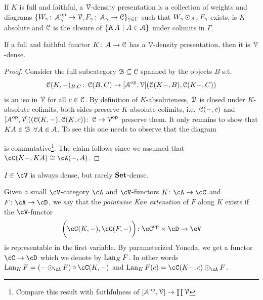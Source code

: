 \documentclass[a4paper,11pt,oneside,openany]{scrbook}
\begin{document}
\begin{defn}
	If $K$ is full and faithful, a $\operatorname{\mathcal{V}}$-density presentation is a collection of
    weights and diagrams $\{W_\gamma\colon\operatorname{\mathcal{A}}^{\operatorname{\text{op}}}_\gamma\to\operatorname{\mathcal{V}},
    F_\gamma\colon\operatorname{\mathcal{A}}_\gamma\to\operatorname{\mathcal{C}}\}_{\gamma\in\Gamma}$ such that
    $W_\gamma\operatorname{\odot}_{\operatorname{\mathcal{A}}_\gamma}F_\gamma$ exists, is $K$-absolute and $\operatorname{\mathcal{C}}$ is the
    closure of $\{KA\ |\ A\in\operatorname{\mathcal{A}}\}$ under colimits in $\Gamma$.
\end{defn}
\begin{prop}
	If a full and faithful functor $K\colon\operatorname{\mathcal{A}}\to\operatorname{\mathcal{C}}$ has a $\operatorname{\mathcal{V}}$-density
    presentation, then it is $\operatorname{\mathcal{V}}$-dense.
\end{prop}
\begin{proof}
	Consider the full subcategory $\operatorname{\mathcal{B}}\subseteq\operatorname{\mathcal{C}}$ spanned by the objects $B$
    s.t.\ $$\operatorname{\mathcal{C}}(K,-)_{B,C}\colon\operatorname{\mathcal{C}}(B,C)\to[\operatorname{\mathcal{A}}^{\operatorname{\text{op}}},\operatorname{\mathcal{V}}](\operatorname{\mathcal{C}}(K-,B),\operatorname{\mathcal{C}}(K-,C))$$ is
    an iso in $\operatorname{\mathcal{V}}$ for all $c\in\operatorname{\mathcal{C}}$. By definition of $K$-absoluteness, $\operatorname{\mathcal{B}}$ is
    closed under $K$-absolute colimits, both sides preserve $K$-absolute
    colimits, i.e.\ $\operatorname{\mathcal{C}}(-,c)$ and
    $[\operatorname{\mathcal{A}}^{\operatorname{\text{op}}},\operatorname{\mathcal{V}}]((\operatorname{\mathcal{C}}(K,-),\operatorname{\mathcal{C}}(K,c))\colon\operatorname{\mathcal{C}}\to\operatorname{\mathcal{V}}^{\operatorname{\text{op}}}$ preserve them. It only
    remains to show that $KA\in\operatorname{\mathcal{B}}\ \forall A\in\operatorname{\mathcal{A}}$. To see this one needs to
    observe that the diagram
	\begin{center}
	\end{center}
	is commutative\footnote{Compare this result with faithfulness of
    $[\operatorname{\mathcal{A}}^{\operatorname{\text{op}}},\operatorname{\mathcal{V}}]\to\prod\operatorname{\mathcal{V}}$ }. The claim follows since we assumed that
    $\cC(K-,KA)\cong\cA(-,A)$.
\end{proof}
\begin{exmp}
	$ I \in \cV $ is always dense, but rarely $ {\normalfont\textbf{Set}} $-dense.
\end{exmp}
\begin{defn}
	Given a small $ \cV $-category $ \cA $ and $ \cV $-functors $ K\from \cA \to
    \cC $ and $ F \from \cA \to \cD$, we say that the \emph{pointwise Kan
    extenstion} of $ F $ along $ K $ exists if the $ \cV $-functor
	\begin{displaymath}
		[\cA^{\op}, \cV]\bigg(\cC(K,-) ,\cC(F,-)\bigg) \from \cC^{\op} \times  \cD \to \cV
	\end{displaymath}
	is representable in the first variable.
	By parameterized Yoneda, we get a functor $ \cC \to \cD $ which we denote by
    $ \operatorname{Lan}_K F $. In other words $ \Lan_K F = (- \odot_\cA F) \circ\cC(K,-) $
    and $ \Lan_K F(c) = \cC(K-,c)\odot _\cA F $.
\end{defn}
\end{document}
